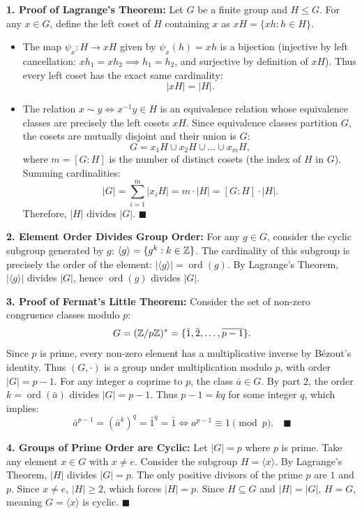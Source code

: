 \begin{solution}
\textbf{1. Proof of Lagrange's Theorem:}
Let $G$ be a finite group and $H \le G$.
For any $x \in G$, define the left coset of $H$ containing $x$ as $xH = \{xh : h \in H\}$.
\begin{itemize}[leftmargin=1.5em,itemsep=2pt]
  \item The map $\psi_x: H \to xH$ given by $\psi_x(h) = xh$ is a bijection (injective by left cancellation: $xh_1 = xh_2 \implies h_1 = h_2$, and surjective by definition of $xH$). Thus every left coset has the exact same cardinality:
  \[
  |xH| = |H|.
  \]
  \item The relation $x \sim y \iff x^{-1}y \in H$ is an equivalence relation whose equivalence classes are precisely the left cosets $xH$.
  Since equivalence classes partition $G$, the cosets are mutually disjoint and their union is $G$:
  \[
  G = x_1 H \cup x_2 H \cup \dots \cup x_m H,
  \]
  where $m = [G : H]$ is the number of distinct cosets (the index of $H$ in $G$).
  Summing cardinalities:
  \[
  |G| = \sum_{i=1}^m |x_i H| = m \cdot |H| = [G : H] \cdot |H|.
  \]
  Therefore, $|H|$ divides $|G|$. \hfill $\blacksquare$
\end{itemize}

\textbf{2. Element Order Divides Group Order:}
For any $g \in G$, consider the cyclic subgroup generated by $g$: $\langle g \rangle = \{g^k : k \in \mathbb{Z}\}$.
The cardinality of this subgroup is precisely the order of the element: $|\langle g \rangle| = \operatorname{ord}(g)$.
By Lagrange's Theorem, $|\langle g \rangle|$ divides $|G|$, hence $\operatorname{ord}(g)$ divides $|G|$.

\textbf{3. Proof of Fermat's Little Theorem:}
Consider the set of non-zero congruence classes modulo $p$:
\[
G = (\mathbb{Z}/p\mathbb{Z})^* = \{\bar{1}, \bar{2}, \dots, \overline{p-1}\}.
\]
Since $p$ is prime, every non-zero element has a multiplicative inverse by Bézout's identity. Thus $(G, \cdot)$ is a group under multiplication modulo $p$, with order $|G| = p - 1$.
For any integer $a$ coprime to $p$, the class $\bar{a} \in G$.
By part 2, the order $k = \operatorname{ord}(\bar{a})$ divides $|G| = p - 1$.
Thus $p - 1 = kq$ for some integer $q$, which implies:
\[
\bar{a}^{p-1} = (\bar{a}^k)^q = \bar{1}^q = \bar{1} \iff a^{p-1} \equiv 1 \pmod p. \quad \blacksquare
\]

\textbf{4. Groups of Prime Order are Cyclic:}
Let $|G| = p$ where $p$ is prime. Take any element $x \in G$ with $x \ne e$.
Consider the subgroup $H = \langle x \rangle$. By Lagrange's Theorem, $|H|$ divides $|G| = p$.
The only positive divisors of the prime $p$ are $1$ and $p$.
Since $x \ne e$, $|H| \ge 2$, which forces $|H| = p$.
Since $H \subseteq G$ and $|H| = |G|$, $H = G$, meaning $G = \langle x \rangle$ is cyclic. \hfill $\blacksquare$
\end{solution}

